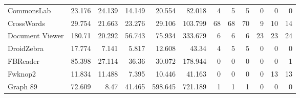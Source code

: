 \begin{table*}[t]
\begin{tabular}{l||r|r|r|r|r||r|r|r||r|r|r}
  CommonsLab             & 23.176                & 24.139                   & 14.149                     & 20.554                                     & 82.018                                  & 4                           & 5                            & 5                         & 0                           & 0                            & 0                          \\
  CrossWords             & 29.754                & 21.663                   & 23.276                     & 29.106                                     & 103.799                                 & 68                          & 68                           & 70                        & 9                           & 10                           & 14                         \\
  Document Viewer        & 180.71                & 20.292                   & 56.743                     & 75.934                                     & 333.679                                 & 6                           & 6                            & 6                         & 23                          & 23                           & 24                         \\
  DroidZebra             & 17.774                & 7.141                    & 5.817                      & 12.608                                     & 43.34                                   & 4                           & 5                            & 5                         & 0                           & 0                            & 0                          \\
  FBReader               & 85.398                & 27.114                   & 36.36                      & 30.072                                     & 178.944                                 & 0                           & 0                            & 0                         & 0                           & 0                            & 1                          \\
  Fwknop2                & 11.834                & 11.488                   & 7.395                      & 10.446                                     & 41.163                                  & 0                           & 0                            & 0                         & 0                           & 13                           & 13                         \\
  Graph 89               & 72.609                & 8.47                     & 41.465                     & 598.645                                    & 721.189                                 & 1                           & 1                            & 1                         & 0                           & 0                            & 0                          \\

\end{tabular}
\end{table*}
